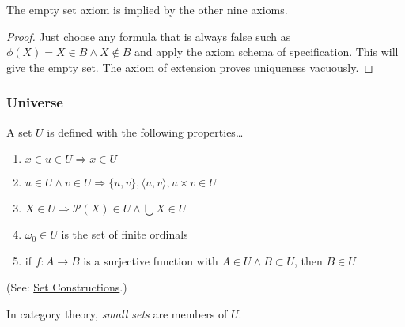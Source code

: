 \begin{proposition}
	The empty set axiom is implied by the other nine axioms.
\end{proposition}

\begin{proof}
	Just choose any formula that is always false such as $\phi(X) = X \in B \land X \not \in B$ and apply the axiom schema of specification. This
	will give the empty set. The axiom of extension proves uniqueness vacuously.
\end{proof}

\subsubsection{Universe}\label{universe}
A set $U$ is defined with the following properties\dots
\begin{enumerate}
  \item $x \in u \in U \Rightarrow x \in U$
  \item $u \in U \land v \in U \Rightarrow \{u,v\}, \langle u,v \rangle, u \times v \in U$
  \item $X \in U \Rightarrow \mathcal{P}(X) \in U \land \bigcup X \in U$
  \item $\omega_0 \in U$ is the set of finite ordinals
  \item if $f:A \rightarrow B$ is a surjective function with $A \in U \land B \subset U$, then $B \in U$
\end{enumerate}

(See: \hyperref[setconstructions]{Set Constructions}.)\newline

\noindent In category theory, \emph{small sets} are members of $U$. \label{smallsets}